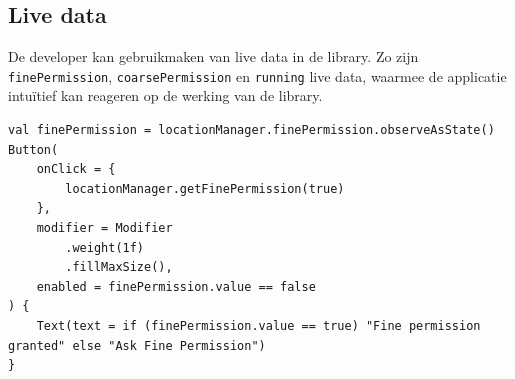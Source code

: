 \subsection{Live data}
De developer kan gebruikmaken van live data in de library. Zo zijn \texttt{finePermission}, \texttt{coarsePermission} en \texttt{running} live data, waarmee de applicatie intuïtief kan reageren op de werking van de library.
\begin{verbatim}
val finePermission = locationManager.finePermission.observeAsState()
Button(
    onClick = {
        locationManager.getFinePermission(true)
    },
    modifier = Modifier
        .weight(1f)
        .fillMaxSize(),
    enabled = finePermission.value == false
) {
    Text(text = if (finePermission.value == true) "Fine permission granted" else "Ask Fine Permission")
}
\end{verbatim}
